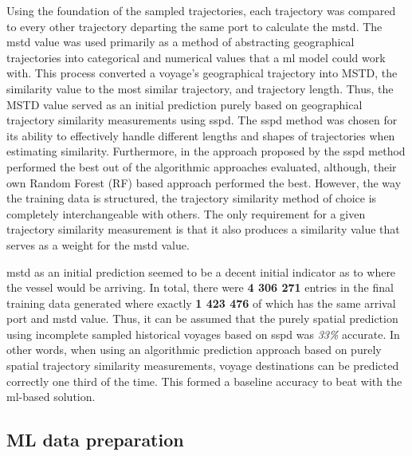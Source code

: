 Using the foundation of the sampled trajectories, each trajectory was compared to every other trajectory departing the same port to calculate the \acrfull{mstd}. The \acrshort{mstd} value was used primarily as a method of abstracting geographical trajectories into categorical and numerical values that a \acrfull{ml} model could work with. This process converted a voyage's geographical trajectory into MSTD, the similarity value to the most similar trajectory, and trajectory length. Thus, the MSTD value served as an initial prediction purely based on geographical trajectory similarity measurements using \acrfull{sspd}. The \acrshort{sspd} method was chosen for its ability to effectively handle different lengths and shapes of trajectories when estimating similarity. Furthermore, in the approach proposed by \cite{Zhang2020AISApproach} the \acrshort{sspd} method performed the best out of the algorithmic approaches evaluated, although, their own Random Forest (RF) based approach performed the best. However, the way the training data is structured, the trajectory similarity method of choice is completely interchangeable with others. The only requirement for a given trajectory similarity measurement is that it also produces a similarity value that serves as a weight for the \acrshort{mstd} value.

\acrshort{mstd} as an initial prediction seemed to be a decent initial indicator as to where the vessel would be arriving. In total, there were \textbf{4 306 271} entries in the final training data generated where exactly \textbf{1 423 476} of which has the same arrival port and \acrshort{mstd} value. Thus, it can be assumed that the purely spatial prediction using incomplete sampled historical voyages based on \acrshort{sspd} was \textit{33\%} accurate. In other words, when using an algorithmic prediction approach based on purely spatial trajectory similarity measurements, voyage destinations can be predicted correctly one third of the time. This formed a baseline accuracy to beat with the \acrshort{ml}-based solution.

\subsection{ML data preparation}

